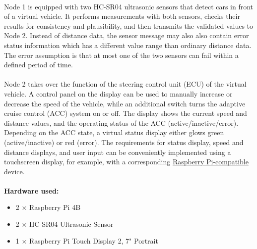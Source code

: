 \paragraph{}
Node 1 is equipped with two HC-SR04 ultrasonic sensors that detect cars in front of a virtual vehicle. It performs measurements with both sensors, checks their results for consistency and plausibility, and then transmits the validated values to Node 2. Instead of distance data, the sensor message may also also contain error status information which has a different value range than ordinary distance data. The error assumption is that at most one of the two sensors can fail within a defined period of time.

\paragraph{}
Node 2 takes over the function of the steering control unit (ECU) of the virtual vehicle. A control panel on the display can be used to manually increase or decrease the speed of the vehicle, while an additional switch turns the adaptive cruise control (ACC) system on or off. The display shows the current speed and distance values, and the operating status of the ACC (active/inactive/error). Depending on the ACC state, a virtual status display either glows green (active/inactive) or red (error). The requirements for status display, speed and distance displays, and user input can be conveniently implemented using a touchscreen display, for example, with a corresponding \href{https://www.berrybase.at/raspberry-pi-touch-display-2-7-portrait} {Raspberry Pi-compatible device}. 

\paragraph{}
\textbf{Hardware used:}
\begin{itemize}
    \item 2 × Raspberry Pi 4B
    \item 2 × HC-SR04 Ultrasonic Sensor
    \item 1 × Raspberry Pi Touch Display 2, 7" Portrait
\end{itemize}
